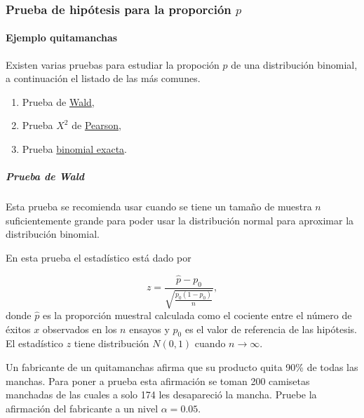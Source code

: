 \documentclass[
]{article}
\providecommand{\tightlist}{%
  \setlength{\itemsep}{0pt}\setlength{\parskip}{0pt}}
\begin{document}
\hypertarget{prueba-de-hipuxf3tesis-para-la-proporciuxf3n-p}{%
\subsubsection{\texorpdfstring{Prueba de hipótesis para la proporción
\(p\)}{Prueba de hipótesis para la proporción p}}\label{prueba-de-hipuxf3tesis-para-la-proporciuxf3n-p}}

\hypertarget{ejemplo-quitamanchas}{%
\paragraph{Ejemplo quitamanchas}\label{ejemplo-quitamanchas}}

Existen varias pruebas para estudiar la propoción \(p\) de una
distribución binomial, a continuación el listado de las más comunes.

\begin{enumerate}
\def\labelenumi{\arabic{enumi}.}
\tightlist
\item
  Prueba de \href{https://en.wikipedia.org/wiki/Wald_test}{Wald},
\item
  Prueba \(X^2\) de
  \href{https://en.wikipedia.org/wiki/Pearson\%27s_chi-squared_test\#Fairness_of_dice}{Pearson},
\item
  Prueba \href{https://en.wikipedia.org/wiki/Binomial_test}{binomial
  exacta}.
\end{enumerate}

\hypertarget{prueba-de-wald}{%
\subparagraph{Prueba de Wald}\label{prueba-de-wald}}

Esta prueba se recomienda usar cuando se tiene un tamaño de muestra
\(n\) suficientemente grande para poder usar la distribución normal para
aproximar la distribución binomial.

En esta prueba el estadístico está dado por

\[z=\frac{\hat{p}-p_0}{\sqrt{\frac{p_0(1-p_0)}{n}}},\] donde \(\hat{p}\)
es la proporción muestral calculada como el cociente entre el número de
éxitos \(x\) observados en los \(n\) ensayos y \(p_0\) es el valor de
referencia de las hipótesis. El estadístico \(z\) tiene distribución
\(N(0, 1)\) cuando \(n \to \infty\).

Un fabricante de un quitamanchas afirma que su producto quita 90\% de
todas las manchas. Para poner a prueba esta afirmación se toman 200
camisetas manchadas de las cuales a solo 174 les desapareció la mancha.
Pruebe la afirmación del fabricante a un nivel \(\alpha=0.05\).
\end{document}
